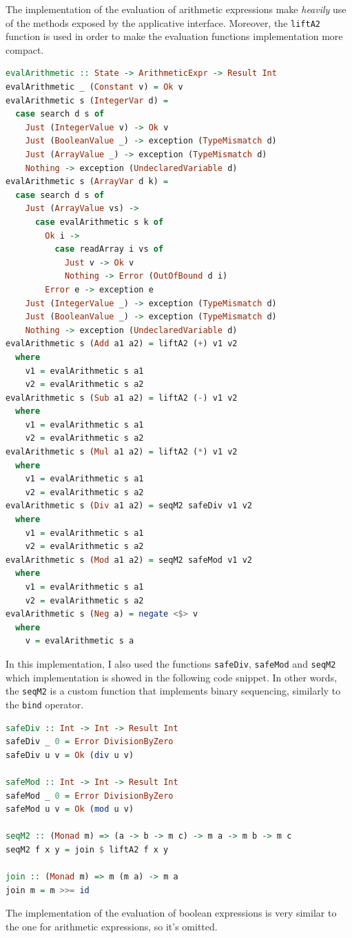 \documentclass[12pt,a4paper]{article}
\begin{document}
The implementation of the evaluation of arithmetic expressions make \textit{heavily} use of the methods exposed by the applicative interface.
Moreover, the \texttt{liftA2} function is used in order to make the evaluation functions implementation more compact.
\begin{lstlisting}[language=Haskell, style=custom-style]
evalArithmetic :: State -> ArithmeticExpr -> Result Int
evalArithmetic _ (Constant v) = Ok v
evalArithmetic s (IntegerVar d) =
  case search d s of
    Just (IntegerValue v) -> Ok v
    Just (BooleanValue _) -> exception (TypeMismatch d)
    Just (ArrayValue _) -> exception (TypeMismatch d)
    Nothing -> exception (UndeclaredVariable d)
evalArithmetic s (ArrayVar d k) =
  case search d s of
    Just (ArrayValue vs) ->
      case evalArithmetic s k of
        Ok i ->
          case readArray i vs of
            Just v -> Ok v
            Nothing -> Error (OutOfBound d i)
        Error e -> exception e
    Just (IntegerValue _) -> exception (TypeMismatch d)
    Just (BooleanValue _) -> exception (TypeMismatch d)
    Nothing -> exception (UndeclaredVariable d)
evalArithmetic s (Add a1 a2) = liftA2 (+) v1 v2
  where
    v1 = evalArithmetic s a1
    v2 = evalArithmetic s a2
evalArithmetic s (Sub a1 a2) = liftA2 (-) v1 v2
  where
    v1 = evalArithmetic s a1
    v2 = evalArithmetic s a2
evalArithmetic s (Mul a1 a2) = liftA2 (*) v1 v2
  where
    v1 = evalArithmetic s a1
    v2 = evalArithmetic s a2
evalArithmetic s (Div a1 a2) = seqM2 safeDiv v1 v2
  where
    v1 = evalArithmetic s a1
    v2 = evalArithmetic s a2
evalArithmetic s (Mod a1 a2) = seqM2 safeMod v1 v2
  where
    v1 = evalArithmetic s a1
    v2 = evalArithmetic s a2
evalArithmetic s (Neg a) = negate <$> v
  where
    v = evalArithmetic s a
\end{lstlisting}
In this implementation, I also used the functions \texttt{safeDiv}, \texttt{safeMod} and \texttt{seqM2} which implementation is showed in the following code snippet.
In other words, the \texttt{seqM2} is a custom function that implements binary sequencing, similarly to the \texttt{bind} operator.
\begin{lstlisting}[language=Haskell, style=custom-style]
safeDiv :: Int -> Int -> Result Int
safeDiv _ 0 = Error DivisionByZero
safeDiv u v = Ok (div u v)

safeMod :: Int -> Int -> Result Int
safeMod _ 0 = Error DivisionByZero
safeMod u v = Ok (mod u v)

seqM2 :: (Monad m) => (a -> b -> m c) -> m a -> m b -> m c
seqM2 f x y = join $ liftA2 f x y

join :: (Monad m) => m (m a) -> m a
join m = m >>= id
\end{lstlisting}
The implementation of the evaluation of boolean expressions is very similar to the one for arithmetic expressions, so it's omitted.
\end{document}
